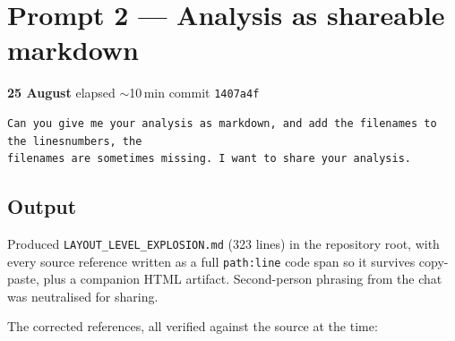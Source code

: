 \documentclass[11pt,a4paper]{article}
\newenvironment{promptbox}{\medskip}{\medskip}
\newcommand{\sha}[1]{\texttt{#1}}
\begin{document}
\section{Prompt 2 --- Analysis as shareable markdown}
\textbf{25 August} \textperiodcentered{} elapsed ${\sim}$10\,min \textperiodcentered{} commit \sha{1407a4f}
\begin{promptbox}
\begin{lstlisting}[style=promptstyle]
Can you give me your analysis as markdown, and add the filenames to the linesnumbers, the
filenames are sometimes missing. I want to share your analysis.
\end{lstlisting}
\end{promptbox}
\subsection*{Output}

Produced \texttt{LAYOUT\_LEVEL\_EXPLOSION.md} (323 lines) in the repository root, with every source
reference written as a full \texttt{path:line} code span so it survives copy-paste, plus a
companion HTML artifact. Second-person phrasing from the chat was neutralised for sharing.

The corrected references, all verified against the source at the time:
\end{document}
